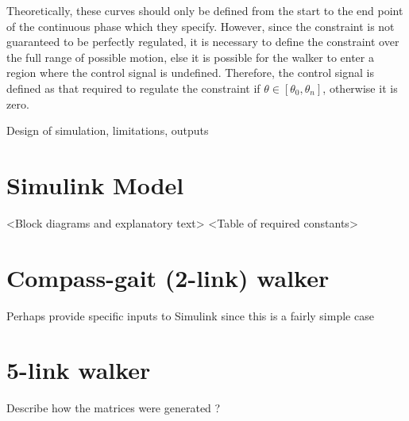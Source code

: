 {\color{orange}Theoretically, these curves should only be defined from the start to the end point of the continuous phase which they specify. However, since the constraint is not guaranteed to be perfectly regulated, it is necessary to define the constraint over the full range of possible motion, else it is possible for the walker to enter a region where the control signal is undefined. Therefore, the control signal is defined as that required to regulate the constraint if $\theta \in [\theta_0, \theta_n]$, otherwise it is zero.}

{\color{blue}Design of simulation, limitations, outputs}

\section{Simulink Model}
<Block diagrams and explanatory text>
<Table of required constants>

\section{Compass-gait (2-link) walker}
Perhaps provide specific inputs to Simulink since this is a fairly simple case

\section{5-link walker}
Describe how the matrices were generated \cite{westervelt2007feedback}?